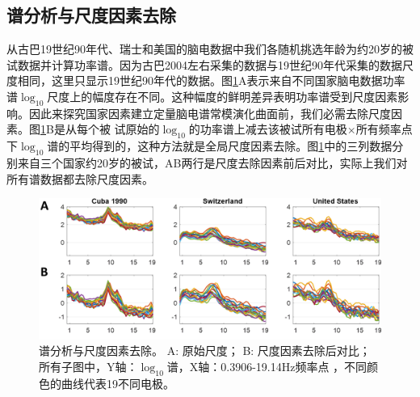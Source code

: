 \subsection{谱分析与尺度因素去除}
从古巴19世纪90年代、瑞士和美国的脑电数据中我们各随机挑选年龄为约20岁的被试数据并计算功率谱。因为古巴2004左右采集的数据与19世纪90年代采集的数据尺度相同，这里只显示19世纪90年代的数据。图\ref{6:gsf}A表示来自不同国家脑电数据功率谱$\log_{10}$尺度上的幅度存在不同。这种幅度的鲜明差异表明功率谱受到尺度因素影响。因此来探究国家因素建立定量脑电谱常模演化曲面前，我们必需去除尺度因素。图\ref{6:gsf}B是从每个被
试原始的$\log_{10}$的功率谱上减去该被试所有电极$\times$所有频率点下$\log_{10}$谱的平均得到的，这种方法就是全局尺度因素去除。图\ref{6:gsf}中的三列数据分别来自三个国家约20岁的被试，AB两行是尺度去除因素前后对比，实际上我们对所有谱数据都去除尺度因素。
\begin{figure}[!ht]
\includegraphics[width=15cm]{pic/Norm/figure4.png}
\caption{谱分析与尺度因素去除。 A: 原始尺度； B: 尺度因素去除后对比； 所有子图中，Y轴：$\log_{10}$谱，X轴：0.3906-19.14Hz频率点
，不同颜色的曲线代表19不同电极。}
\label{6:gsf}
\end{figure}

